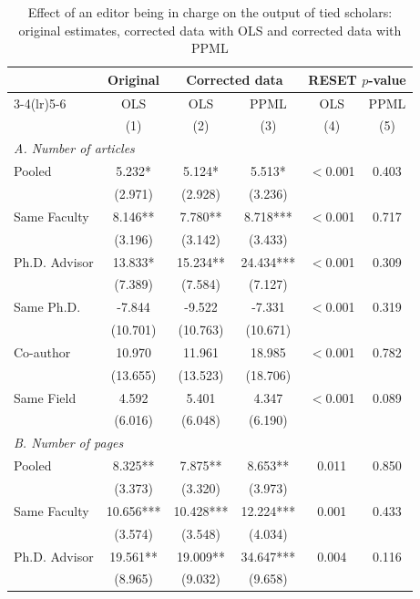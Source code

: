 \begin{table}[!htbp]
\renewcommand{\arraystretch}{0.95}
\centering
{}
\caption{Effect of an editor being in charge on the output of tied scholars: original estimates, corrected data with OLS and corrected data with PPML}
\label{tab:comparison}
\footnotesize
\begin{tabular*}{\linewidth}{@{\extracolsep{\fill}}lccccc}
\toprule
 & Original & \multicolumn{2}{c}{Corrected data} & \multicolumn{2}{c}{RESET $p$-value} \\
\cmidrule(lr){3-4}\cmidrule(lr){5-6}
 & OLS & OLS & PPML & OLS & PPML \\
 & (1) & (2) & (3) & (4) & (5) \\
\midrule
\multicolumn{6}{l}{\textit{A. Number of articles}} \\[2pt]
\quad Pooled & 5.232* & 5.124* & 5.513* & $<$0.001 & 0.403 \\
 & (2.971) & (2.928) & (3.236) & & \\
\quad Same Faculty & 8.146** & 7.780** & 8.718*** & $<$0.001 & 0.717 \\
 & (3.196) & (3.142) & (3.433) & & \\
\quad Ph.D. Advisor & 13.833* & 15.234** & 24.434*** & $<$0.001 & 0.309 \\
 & (7.389) & (7.584) & (7.127) & & \\
\quad Same Ph.D. & -7.844 & -9.522 & -7.331 & $<$0.001 & 0.319 \\
 & (10.701) & (10.763) & (10.671) & & \\
\quad Co-author & 10.970 & 11.961 & 18.985 & $<$0.001 & 0.782 \\
 & (13.655) & (13.523) & (18.706) & & \\
\quad Same Field & 4.592 & 5.401 & 4.347 & $<$0.001 & 0.089 \\
 & (6.016) & (6.048) & (6.190) & & \\[8pt]
\multicolumn{6}{l}{\textit{B. Number of pages}} \\[2pt]
\quad Pooled & 8.325** & 7.875** & 8.653** & 0.011 & 0.850 \\
 & (3.373) & (3.320) & (3.973) & & \\
\quad Same Faculty & 10.656*** & 10.428*** & 12.224*** & 0.001 & 0.433 \\
 & (3.574) & (3.548) & (4.034) & & \\
\quad Ph.D. Advisor & 19.561** & 19.009** & 34.647*** & 0.004 & 0.116 \\
 & (8.965) & (9.032) & (9.658) & & \\

\end{tabular*}
\end{table}
